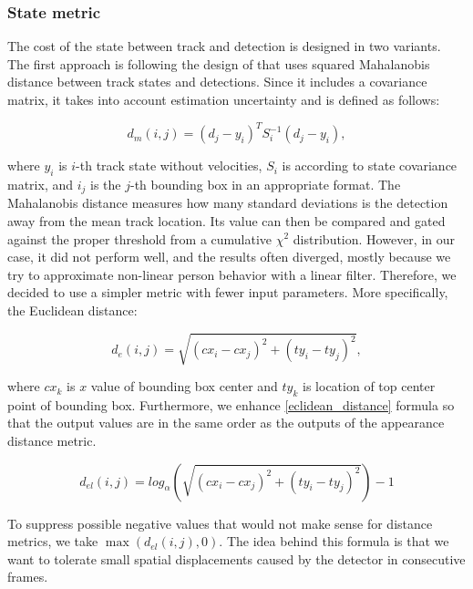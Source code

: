         \subsubsection{State metric}
            The cost of the state between track and detection is designed in two variants. The first approach is following the design of \cite{wojke2017simple} that uses squared Mahalanobis distance between track states and detections. Since it includes a covariance matrix, it takes into account estimation uncertainty and is defined as follows:
            
            \begin{equation}
                d_m(i,j) = \left(d_j - y_i\right)^T S_i^{-1} \left(d_j - y_i\right), 
            \end{equation}
            
            where $y_i$ is $i$-th track state without velocities, $S_i$ is according to state covariance matrix, and $i_j$ is the $j$-th bounding box in an appropriate format. The Mahalanobis distance measures how many standard deviations is the detection away from the mean track location. Its value can then be compared and gated against the proper threshold from a cumulative $\chi^2$ distribution. However, in our case, it did not perform well, and the results often diverged, mostly because we try to approximate non-linear person behavior with a linear filter. Therefore, we decided to use a simpler metric with fewer input parameters. More specifically, the Euclidean distance:  
    
            \begin{equation}\label{eclidean_distance}
                d_e(i,j) = \sqrt{\left(cx_i - cx_j\right)^2 + \left(ty_i - ty_j\right)^2}, 
            \end{equation}
        
            where $cx_k$ is $x$ value of bounding box center and $ty_k$ is location of top center point of bounding box. Furthermore, we enhance \ref{eclidean_distance} formula so that the output values are in the same order as the outputs of the appearance distance metric. 
            
            \begin{equation}
                d_{el}(i,j) = log_{\alpha}\left(\sqrt{\left(cx_i - cx_j\right)^2 + \left(ty_i - ty_j\right)^2}\right) - 1
            \end{equation}
            
            To suppress possible negative values that would not make sense for distance metrics, we take $ \max \left(d_{el}(i,j), 0 \right)$. The idea behind this formula is that we want to tolerate small spatial displacements caused by the detector in consecutive frames. 
            
